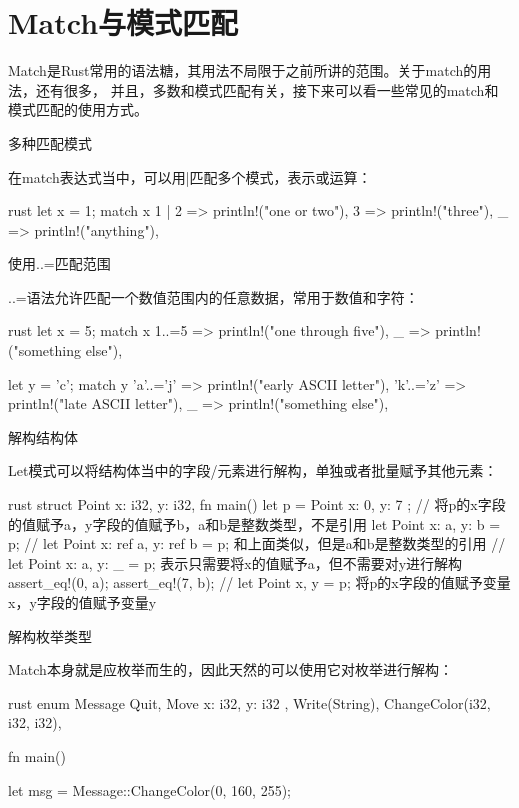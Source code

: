 \section{Match与模式匹配}
Match是Rust常用的语法糖，其用法不局限于之前所讲的范围。关于match的用法，还有很多，
并且，多数和模式匹配有关，接下来可以看一些常见的match和模式匹配的使用方式。
\begin{outline}[enumerate]
\1 多种匹配模式

在match表达式当中，可以用|匹配多个模式，表示或运算：
\begin{code-in-enumerate}{rust}
let x = 1;
match x {
    1 | 2 => println!("one or two"),
    3 => println!("three"),
    _ => println!("anything"),
}
\end{code-in-enumerate}

\1 使用..=匹配范围

..=语法允许匹配一个数值范围内的任意数据，常用于数值和字符：
\begin{code-in-enumerate}{rust}
let x = 5;
match x {
    1..=5 => println!("one through five"),
    _ => println!("something else"),
}

let y = 'c';
match y {
    'a'..='j' => println!("early ASCII letter"),
    'k'..='z' => println!("late ASCII letter"),
    _ => println!("something else"),
}
\end{code-in-enumerate}

\1 解构结构体

Let模式可以将结构体当中的字段/元素进行解构，单独或者批量赋予其他元素：
\begin{code-in-enumerate}{rust}
struct Point {
    x: i32,
    y: i32,
}
fn main() {
    let p = Point { x: 0, y: 7 };
    // 将p的x字段的值赋予a，y字段的值赋予b，a和b是整数类型，不是引用
    let Point { x: a, y: b } = p;
    // let Point {x: ref a, y: ref b} = p; 和上面类似，但是a和b是整数类型的引用
    // let Point {x: a, y: _} = p; 表示只需要将x的值赋予a，但不需要对y进行解构
    assert_eq!(0, a);
    assert_eq!(7, b);
    // let Point {x, y} = p; 将p的x字段的值赋予变量x，y字段的值赋予变量y
}
\end{code-in-enumerate}

\1 解构枚举类型

Match本身就是应枚举而生的，因此天然的可以使用它对枚举进行解构：
\begin{code-in-enumerate}{rust}
enum Message {
    Quit,
    Move { x: i32, y: i32 },
    Write(String),
    ChangeColor(i32, i32, i32),
}

fn main() {
    let msg = Message::ChangeColor(0, 160, 255);

}
\end{code-in-enumerate}
\end{outline}
